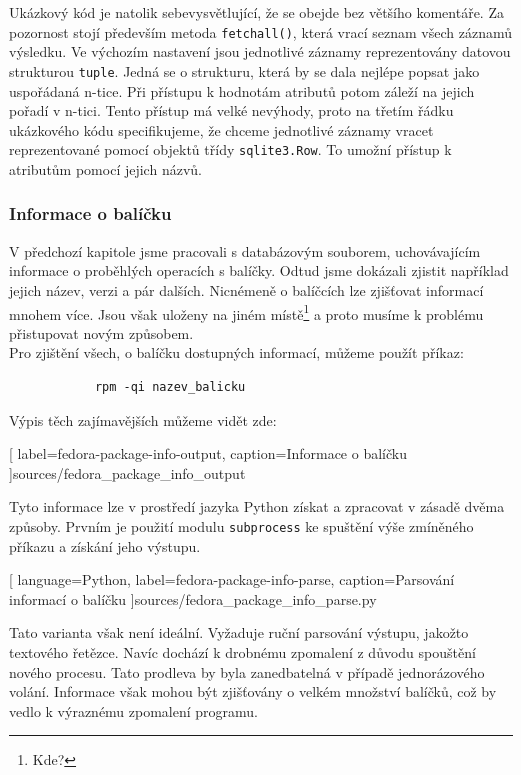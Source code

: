\documentclass[
  field=inf,
  biblatex,
  glossaries,
  index
]{kidiplom}
\begin{document}
		Ukázkový kód je natolik sebevysvětlující, že se obejde bez většího komentáře. Za pozornost stojí především metoda \texttt{fetchall()}, která vrací seznam všech záznamů výsledku. Ve výchozím nastavení jsou jednotlivé záznamy reprezentovány datovou strukturou \texttt{tuple}. Jedná se o strukturu, která by se dala nejlépe popsat jako uspořádaná n-tice. Při přístupu k hodnotám atributů potom záleží na jejich pořadí v n-tici. Tento přístup má velké nevýhody, proto na třetím řádku ukázkového kódu specifikujeme, že chceme jednotlivé záznamy vracet reprezentované pomocí objektů třídy \texttt{sqlite3.Row}. To umožní přístup k atributům pomocí jejich názvů.

		\subsubsection{Informace o balíčku}
		V předchozí kapitole jsme pracovali s databázovým souborem, uchovávajícím informace o proběhlých operacích s balíčky. Odtud jsme dokázali zjistit například jejich název, verzi a pár dalších. Nicnémeně o balíčcích lze zjišťovat informací mnohem více. Jsou však uloženy na jiném místě\footnote{Kde?} a proto musíme k problému přistupovat novým způsobem.
		\\
		Pro zjištění všech, o balíčku dostupných informací, můžeme použít příkaz:

		\begin{lstlisting}
			rpm -qi nazev_balicku
		\end{lstlisting}

		Výpis těch zajímavějších můžeme vidět zde:
		
		[
			label=fedora-package-info-output,
			caption={Informace o balíčku}
		]{sources/fedora_package_info_output}

		Tyto informace lze v prostředí jazyka Python získat a zpracovat v zásadě dvěma způsoby. Prvním je použití modulu \texttt{subprocess} ke spuštění výše zmíněného příkazu a získání jeho výstupu.
		
		[
			language=Python,
			label=fedora-package-info-parse,
			caption={Parsování informací o balíčku}
		]{sources/fedora_package_info_parse.py}

		Tato varianta však není ideální. Vyžaduje ruční parsování výstupu, jakožto textového řetězce. Navíc dochází k drobnému zpomalení z důvodu spouštění nového procesu. Tato prodleva by byla zanedbatelná v případě jednorázového volání. Informace však mohou být zjišťovány o velkém množství balíčků, což by vedlo k výraznému zpomalení programu.
\end{document}
